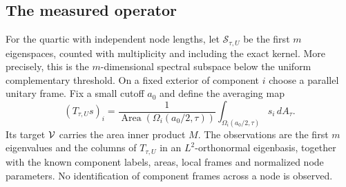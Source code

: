 \subsection{The measured operator}
For the quartic with independent node lengths,
let $\mathcal S_{\tau,U}$ be the first $m$
eigenspaces, counted with multiplicity and
including the exact kernel. More precisely,
this is the $m$-dimensional spectral subspace
below the uniform complementary threshold.
On a fixed exterior of component $i$ choose
a parallel unitary frame. Fix a small cutoff
$a_0$ and define the averaging map
\[
 (T_{\tau,U}s)_i
 =\frac{1}{\operatorname{Area}(\Omega_i(a_0/2,\tau))}
       \int_{\Omega_i(a_0/2,\tau)}s_i\,dA_\tau .
\]
Its target $\mathcal V$ carries the area inner
product $M$. The observations are the first
$m$ eigenvalues and the columns of $T_{\tau,U}$
in an $L^2$-orthonormal eigenbasis, together
with the known component labels, areas,
local frames and normalized node parameters.
No identification of component frames
across a node is observed.

